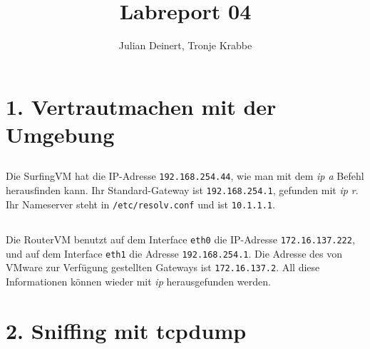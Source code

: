 \documentclass[10pt,a4paper]{article}
\author{Julian Deinert, Tronje Krabbe}
\title{Labreport 04}
\begin{document}
\maketitle
\tableofcontents
\newpage


\section*{1. Vertrautmachen mit der Umgebung}
\setcounter{subsection}{1}

\subsection{}
Die SurfingVM hat die IP-Adresse \texttt{192.168.254.44}, wie man mit dem \textit{ip a} Befehl herausfinden kann.
Ihr Standard-Gateway ist \texttt{192.168.254.1}, gefunden mit \textit{ip r}.
Ihr Nameserver steht in \texttt{/etc/resolv.conf} und ist \texttt{10.1.1.1}.

\subsection{}
Die RouterVM benutzt auf dem Interface \texttt{eth0} die IP-Adresse \texttt{172.16.137.222},
und auf dem Interface \texttt{eth1} die Adresse \texttt{192.168.254.1}.
Die Adresse des von VMware zur Verfügung gestellten Gateways ist \texttt{172.16.137.2}.
All diese Informationen können wieder mit \textit{ip} herausgefunden werden.


\setcounter{section}{2}
\setcounter{subsection}{0}
\section*{2. Sniffing mit tcpdump}
\setcounter{subsection}{1}
\end{document}
